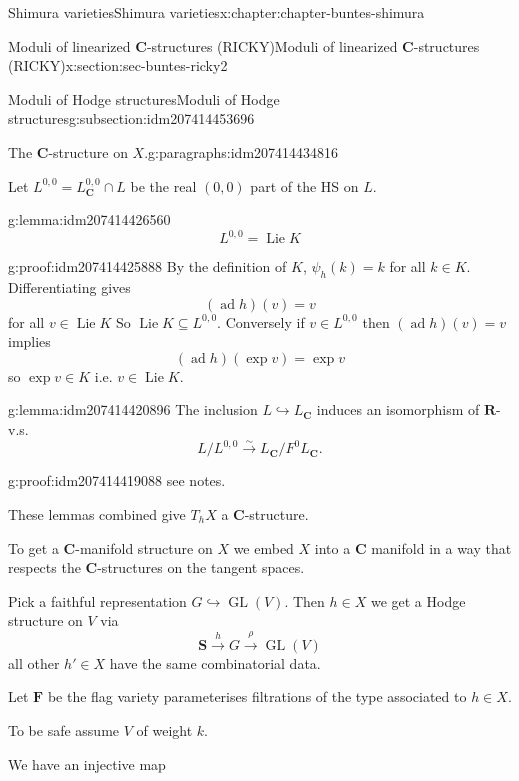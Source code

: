 \documentclass[oneside,10pt,]{book}
\numberwithin{equation}{section}
\DeclareMathOperator{\Lie}{Lie}
\newcommand{\RR}{\mathbf{R}}
\newcommand{\CC}{\mathbf{C}}
\DeclareMathOperator{\ad}{ad}
\DeclareMathOperator{\GL}{GL}
\begin{document}
\begin{chapterptx}{Shimura varieties}{}{Shimura varieties}{}{}{x:chapter:chapter-buntes-shimura}
\begin{sectionptx}{Moduli of linearized \(\CC\)-structures (RICKY)}{}{Moduli of linearized \(\CC\)-structures (RICKY)}{}{}{x:section:sec-buntes-ricky2}
\begin{subsectionptx}{Moduli of Hodge structures}{}{Moduli of Hodge structures}{}{}{g:subsection:idm207414453696}
\begin{paragraphs}{The \(\CC\)-structure on \(X\).}{g:paragraphs:idm207414434816}
\par
Let \(L^{0,0} = L_\CC^{0,0} \cap L\) be the real \((0,0)\) part of the HS on \(L\).%
\begin{lemma}{}{}{g:lemma:idm207414426560}%
%
\begin{equation*}
L^{0,0} = \Lie K
\end{equation*}
%
\end{lemma}
\begin{proofptx}{}{g:proof:idm207414425888}
By the definition of \(K\), \(\psi_h(k) = k\) for all \(k \in K\). Differentiating gives%
\begin{equation*}
(\ad h) (v) = v
\end{equation*}
for all \(v \in \Lie K\) So \(\Lie K  \subseteq L^{0,0}\). Conversely if \(v \in L^{0,0}\) then \((\ad h) (v)=v\) implies%
\begin{equation*}
(\ad h)(\exp v) = \exp v
\end{equation*}
so \(\exp v \in K\) i.e. \(v \in \Lie K\).%
\end{proofptx}
\begin{lemma}{}{}{g:lemma:idm207414420896}%
The inclusion \(L \hookrightarrow L_\CC\) induces an isomorphism of \(\RR\)-v.s.%
\begin{equation*}
L/L^{0,0} \xrightarrow\sim L_\CC / F^0 L_\CC\text{.}
\end{equation*}
%
\end{lemma}
\begin{proofptx}{}{g:proof:idm207414419088}
see notes.%
\end{proofptx}
These lemmas combined give \(T_h X\) a  \(\CC\)-structure.%
\par
To get a \(\CC\)-manifold structure on \(X\) we embed \(X\) into a \(\CC\) manifold in a way that respects the \(\CC\)-structures on the tangent spaces.%
\par
Pick a faithful representation \(G \hookrightarrow \GL(V)\). Then \(h \in X\) we get a Hodge structure on \(V\) via%
\begin{equation*}
\mathbf S \xrightarrow h G \xrightarrow \rho \GL(V)
\end{equation*}
all other \(h' \in X\) have the same combinatorial data.%
\par
Let \(\mathbf F\) be the flag variety parameterises filtrations of the type associated to \(h \in X\).%
\par
To be safe assume \(V\) of weight \(k\).%
\par
We have an injective map%
\begin{equation*}

\end{equation*}
\end{paragraphs}
\end{subsectionptx}
\end{sectionptx}
\end{chapterptx}
\end{document}
